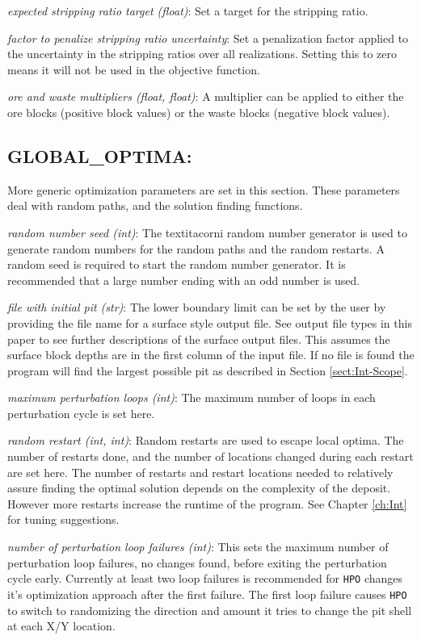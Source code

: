         \textit{expected stripping ratio target (float)}: Set a target for the stripping ratio.

        \textit{factor to penalize stripping ratio uncertainty}: Set a penalization factor applied to the uncertainty in the stripping ratios over all realizations. Setting this to zero means it will not be used in the objective function.

        \textit{ore and waste multipliers (float, float)}: A multiplier can be applied to either the ore blocks (positive block values) or the waste blocks (negative block values).

    \subsection{GLOBAL\_OPTIMA:}

        More generic optimization parameters are set in this section. These parameters deal with random paths, and the solution finding functions.

        \textit{random number seed (int)}: The textit{acorni} random number generator is used to generate random numbers for the random paths and the random restarts. A random seed is required to start the random number generator. It is recommended that a large number ending with an odd number is used.

        \textit{file with initial pit (str)}: The lower boundary limit can be set by the user by providing the file name for a surface style output file. See output file types in this paper to see further descriptions of the surface output files. This assumes the surface block depths are in the first column of the input file. If no file is found the program will find the largest possible pit as described in Section \ref{sect:Int-Scope}.

        \textit{maximum perturbation loops (int)}: The maximum number of loops in each perturbation cycle is set here.

        \textit{random restart (int, int)}: Random restarts are used to escape local optima. The number of restarts done, and the number of locations changed during each restart are set here. The number of restarts and restart locations needed to relatively assure finding the optimal solution depends on the complexity of the deposit. However more restarts increase the runtime of the program. See Chapter \ref{ch:Int} for tuning suggestions.

        \textit{number of perturbation loop failures (int)}: This sets the maximum number of perturbation loop failures, no changes found, before exiting the perturbation cycle early. Currently at least two loop failures is recommended for \texttt{HPO} changes it's optimization approach after the first failure. The first loop failure causes \texttt{HPO} to switch to randomizing the direction and amount it tries to change the pit shell at each X/Y location.

